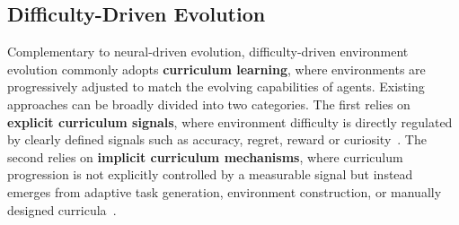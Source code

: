 \subsection{Difficulty-Driven Evolution}\label{sec:diff_evo}
Complementary to neural-driven evolution, difficulty-driven environment evolution commonly adopts \textbf{curriculum learning}, where environments are progressively adjusted to match the evolving capabilities of agents.
Existing approaches can be broadly divided into two categories. 
The first relies on \textbf{explicit curriculum signals}, where environment difficulty is directly regulated by clearly defined signals such as accuracy, regret, reward or curiosity~\cite{RLVE,SCALER,GenEnv,CuES}. 
The second relies on \textbf{implicit curriculum mechanisms}, where curriculum progression is not explicitly controlled by a measurable signal but instead emerges from adaptive task generation, environment construction, or manually designed curricula~\cite{DreamGym,AgentGen,Reasoning_Core,Environment_Tuning}. 

